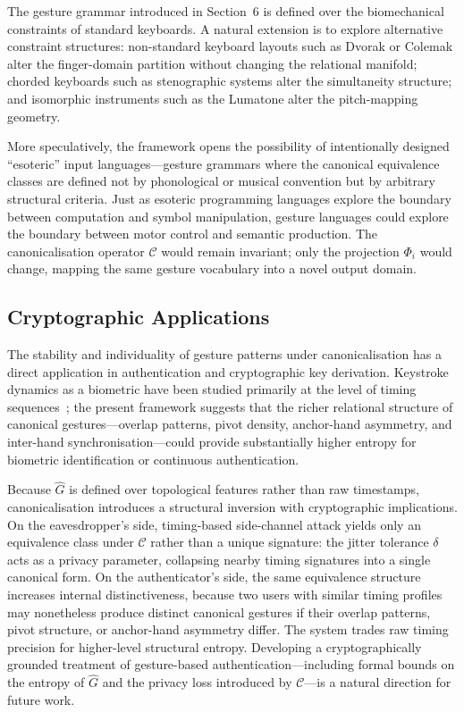 \documentclass[11pt, a4paper]{article}
\begin{document}
The gesture grammar introduced in Section~6 is defined over the
biomechanical constraints of standard keyboards. A natural extension is
to explore alternative constraint structures: non-standard keyboard
layouts such as Dvorak or Colemak alter the finger-domain partition
without changing the relational manifold; chorded keyboards such as
stenographic systems alter the simultaneity structure; and isomorphic
instruments such as the Lumatone alter the pitch-mapping geometry.

More speculatively, the framework opens the possibility of intentionally
designed ``esoteric'' input languages---gesture grammars where the
canonical equivalence classes are defined not by phonological or
musical convention but by arbitrary structural criteria. Just as esoteric
programming languages explore the boundary between computation and symbol
manipulation, gesture languages could explore the boundary between motor
control and semantic production. The canonicalisation operator
$\mathcal{C}$ would remain invariant; only the projection $\Phi_i$
would change, mapping the same gesture vocabulary into a novel output
domain.

\subsection{Cryptographic Applications}

The stability and individuality of gesture patterns under canonicalisation
has a direct application in authentication and cryptographic key
derivation. Keystroke dynamics as a biometric have been studied
primarily at the level of timing sequences~\cite{killourhy2009,monrose2000};
the present framework suggests that the richer relational structure of
canonical gestures---overlap patterns, pivot density, anchor-hand
asymmetry, and inter-hand synchronisation---could provide substantially
higher entropy for biometric identification or continuous authentication.

Because $\hat{G}$ is defined over topological features rather than raw
timestamps, canonicalisation introduces a structural inversion with
cryptographic implications. On the eavesdropper's side, timing-based
side-channel attack yields only an equivalence class under $\mathcal{C}$
rather than a unique signature: the jitter tolerance $\delta$ acts as a
privacy parameter, collapsing nearby timing signatures into a single
canonical form. On the authenticator's side, the same equivalence
structure increases internal distinctiveness, because two users with
similar timing profiles may nonetheless produce distinct canonical
gestures if their overlap patterns, pivot structure, or anchor-hand
asymmetry differ. The system trades raw timing precision for higher-level
structural entropy. Developing a cryptographically grounded treatment of
gesture-based authentication---including formal bounds on the entropy of
$\hat{G}$ and the privacy loss introduced by $\mathcal{C}$---is a
natural direction for future work.
\end{document}
